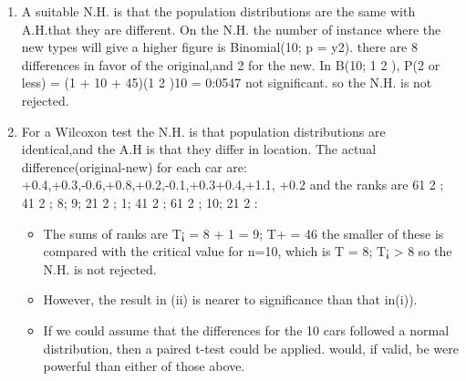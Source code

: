 \documentclass[a4paper,12pt]{article}
\begin{document}
\begin{enumerate}
\item A suitable N.H. is that the population distributions are the same with A.H.that
they are different. On the N.H. the number of instance where the new types will give a
higher figure is Binomial(10; p = y2).
there are 8 differences in favor of the original,and 2 for the new.
In B(10; 1
2 ), P(2 or less) = (1 + 10 + 45)(1
2 )10 = 0:0547 not significant. so the N.H. is
not rejected.

\item For a Wilcoxon test the N.H. is that population distributions are identical,and
the A.H is that they differ in location.
The actual difference(original-new) for each car are: +0.4,+0.3,-0.6,+0.8,+0.2,-0.1,+0.3+0.4,+1.1,
+0.2 and the ranks are 61
2 ; 41
2 ; 8; 9; 21
2 ; 1; 41
2 ; 61
2 ; 10; 21
2 : 

\begin{itemize}
    \item The sums of ranks are T¡ =
8 + 1 = 9; T+ = 46 the smaller of these is compared with the critical value for n=10,
which is T = 8; T¡ > 8 so the N.H. is not rejected.
\item However, the result in (ii) is nearer to significance than that in(i)).
\item If we could assume that the differences for the 10 cars followed a normal distribution,
then a paired t-test could be applied.  \itemIt would, if valid, be were powerful than either of
those above.  
\end{itemize}
\end{enumerate}
\end{document}
